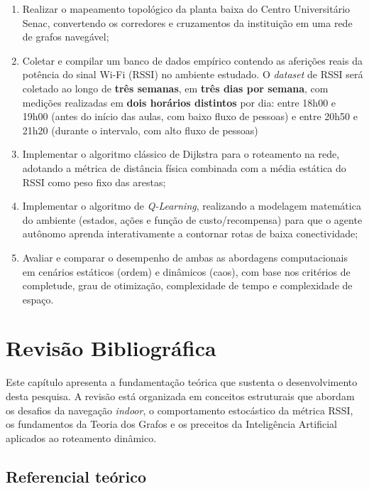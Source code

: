 \documentclass[
    12pt,                %
    openright,           %
    oneside,             %
    a4paper,             %
    english,             %
    brazil               %
]{abntex2}
\begin{document}
\begin{enumerate}
    \item Realizar o mapeamento topológico da planta baixa do Centro Universitário Senac, convertendo os corredores e cruzamentos da instituição em uma rede de grafos navegável;
    \item Coletar e compilar um banco de dados empírico contendo as aferições reais da potência do sinal Wi-Fi (RSSI) no ambiente estudado. O \textit{dataset} de RSSI será coletado ao longo de \textbf{três semanas},
em \textbf{três dias por semana}, com medições realizadas em \textbf{dois horários
distintos} por dia: entre 18h00 e 19h00 (antes do início das aulas, com baixo fluxo
de pessoas) e entre 20h50 e 21h20 (durante o intervalo, com alto fluxo de pessoas)

    \item Implementar o algoritmo clássico de Dijkstra para o roteamento na rede, adotando a métrica de distância física combinada com a média estática do RSSI como peso fixo das arestas;
    \item Implementar o algoritmo de \textit{Q-Learning}, realizando a modelagem matemática do ambiente (estados, ações e função de custo/recompensa) para que o agente autônomo aprenda interativamente a contornar rotas de baixa conectividade;
    \item Avaliar e comparar o desempenho de ambas as abordagens computacionais em cenários estáticos (ordem) e dinâmicos (caos), com base nos critérios de completude, grau de otimização, complexidade de tempo e complexidade de espaço.
\end{enumerate}
\chapter{Revisão Bibliográfica}
\label{cap:revisao}

Este capítulo apresenta a fundamentação teórica que sustenta o desenvolvimento desta pesquisa. A revisão está organizada em conceitos estruturais que abordam os desafios da navegação \textit{indoor}, o comportamento estocástico da métrica RSSI, os fundamentos da Teoria dos Grafos e os preceitos da Inteligência Artificial aplicados ao roteamento dinâmico.

\section{Referencial teórico}
\label{sec:referencial}
\end{document}
